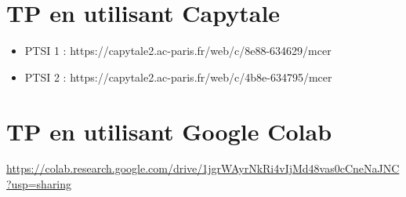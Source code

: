 \documentclass[10pt,fleqn]{article} %
\newcommand{\repRel}{../../../..}
\newcommand{\repStyle}{\repRel/Style}
\begin{document}
\livrettrue
\graphicspath{{\repStyle/png/}}

\graphicspath{{\repStyle/png/}{\repRel/Informatique/Semestre_01/01_Bases/Cours/images/}}
%


\def\xxcompetences{}
\def\xxfigures{}
\def\xxchapitre{}
\def\xxtitreexo{Activités pratiques}
\def\xxsourceexo{}
\def\xxactivite{TP 01 \ifprof  -- Corrigé \else \fi}



\proffalse


\graphicspath{{\repStyle/png/}{\repRel/Informatique/Semestre_01/01_Bases/Application_01/images/}}
%

\vspace{5cm}

\section*{TP en utilisant Capytale}

\begin{itemize}
\item PTSI 1 : https://capytale2.ac-paris.fr/web/c/8e88-634629/mcer
\item PTSI 2 : https://capytale2.ac-paris.fr/web/c/4b8e-634795/mcer
\end{itemize}

\section*{TP en utilisant Google Colab}

\url{https://colab.research.google.com/drive/1jgrWAyrNkRi4vIjMd48vas0cCneNaJNC?usp=sharing}
\end{document}

